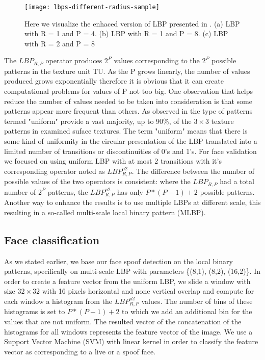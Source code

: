 \begin{figure}[H]
	\begin{center}
		\texttt{[image: lbps-different-radius-sample]}
		\caption[Enhanced LBP visualisation]{Here we visualize the enhaced version of LBP presented in \cite{OjalaPM02}. (a) LBP with R = 1 and P = 4. (b) LBP with R = 1 and P = 8. (c) LBP with R = 2 and P = 8}
	\end{center}
\end{figure}
The $LBP_{R,P}$ operator produces $2^P$ values corresponding to the $2^P$ possible patterns in the texture unit TU. As the P grows linearly, the number of values produced grows exponentially therefore it is obvious that it can create computational problems for values of P not too big. 
One observation that helps reduce the number of values needed to be taken into consideration is that some patterns appear more frequent than others. As observed in \cite{OjalaPM02} the type of patterns termed "uniform" provide a vast majority, up to 90\%, of the $3\times3$ texture patterns in examined suface textures. The term "uniform" means that there is some kind of uniformity in the circular presentation of the LBP translated into a limited number of transitions or discontinuities of 0's and 1's. For face validation we focused on using uniform LBP with at most 2 transitions with it's corresponding operator noted as $LBP_{R,P}^{u2}$. The difference between the number of possible values of the two operators is consistent: where the $LBP_{R,P}$ had a total number of $2^P$ patterns, the $LBP_{R,P}^{u2}$ has only $P*(P-1)+2$ possible patterns.
Another way to enhance the results is to use multiple LBPs at different scale, this resulting in a so-called multi-scale local binary pattern (MLBP).

\subsection{Face classification}
As we stated earlier, we base our face spoof detection on the local binary patterns, specifically on multi-scale LBP with parameters \{(8,1), (8,2), (16,2)\}. In order to create a feature vector from the uniform LBP, we slide a window with size $32\times32$ with 16 pixels horizontal and none vertical overlap and compute for each window a histogram from the $LBP_{R,P}^{u2}$ values. The number of bins of these histograms is set to $P*(P-1) + 2$ to which we add an additional bin for the values that are not uniform. The resulted vector of the concatenation of the histograms for all windows represents the feature vector of the image. We use a Support Vector Machine (SVM) with linear kernel in order to classify the feature vector as corresponding to a live or a spoof face.

